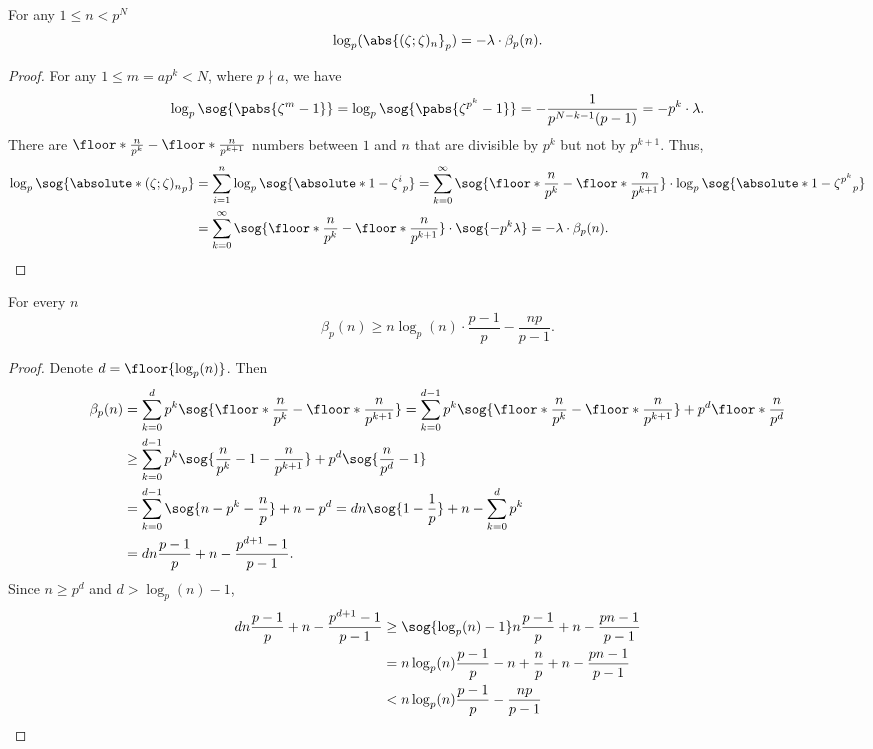 \begin{prop}\label{beta_function}
For any $1\leq n<p^N$ 
\[\log_p(\abs{(\zeta;\zeta)_n}_p)=-\lambda\cdot \beta_p(n).\]
\end{prop}

\begin{proof}
For any $1\leq m=ap^k<N$, where $p\nmid a$, we have
\[\log_p\sog{\pabs{\zeta^m-1}}=\log_p\sog{\pabs{\zeta^{p^k}-1}}=-\frac{1}{p^{N-k-1}(p-1)}=-p^k\cdot \lambda.\]
There are $\floor*{\frac{n}{p^k}}-\floor*{\frac{n}{p^{k+1}}}$ numbers between $1$ and $n$ that are divisible by $p^k$ but not by $p^{k+1}$.
Thus,
\begin{align*}
    \log_p\sog{\absolute*{(\zeta;\zeta)_n}_p}
    &=\sum_{i=1}^n\log_p\sog{\absolute*{1-\zeta^i}_p}
    =\sum_{k=0}^\infty\sog{ \floor*{\frac{n}{p^k}}-\floor*{\frac{n}{p^{k+1}}} }\cdot \log_p\sog{\absolute*{1-\zeta^{p^k}}_p}\\
    &=\sum_{k=0}^\infty\sog{ \floor*{\frac{n}{p^k}}-\floor*{\frac{n}{p^{k+1}}} }\cdot \sog{-p^k\lambda}
    =-\lambda\cdot\beta_p(n).
    \end{align*} 
\end{proof}

\begin{prop}
For every $n$
\[
\beta_p(n)\geq n\log_p(n)\cdot \frac{p-1}{p}-\frac{np}{p-1}.
\]
\end{prop}

\begin{proof}
Denote $d=\floor{\log_p(n)}$.
Then
   \begin{align*}
    \beta_p(n)
    &=\sum_{k=0}^{d}p^k\sog{\floor*{\frac{n}{p^k}}-\floor*{\frac{n}{p^{k+1}}}}
    =\sum_{k=0}^{d-1}p^k\sog{\floor*{\frac{n}{p^k}}-\floor*{\frac{n}{p^{k+1}}}}+p^d\floor*{\frac{n}{p^d}}\\
    &\geq\sum_{k=0}^{d-1}p^k\sog{\frac{n}{p^k}-1-\frac{n}{p^{k+1}}}+p^d\sog{\frac{n} {p^d}-1}\\
    &=\sum_{k=0}^{d-1}\sog{n-p^k-\frac{n}{p}}+n-p^d
    =dn\sog{1-\frac{1}{p}}+n-\sum_{k=0}^{d}p^k\\
    &=dn\frac{p-1}{p}+n-\frac{p^{d+1}-1}{p-1}.
    \end{align*}
Since  $n\geq p^d$ and $d> \log_p(n)-1$,
    \begin{align*}
    dn\frac{p-1}{p}+n-\frac{p^{d+1}-1}{p-1}
    &\geq \sog{\log_p(n)-1} n\frac{p-1}{p}+n-\frac{pn-1}{p-1}\\
    &=n\log_p(n) \frac{p-1}{p}-n+\frac{n}{p}+n-\frac{pn-1}{p-1}\\
    &<  n\log_p(n)\frac{p-1}{p}-\frac{np}{p-1}
    \end{align*} 
\end{proof}


